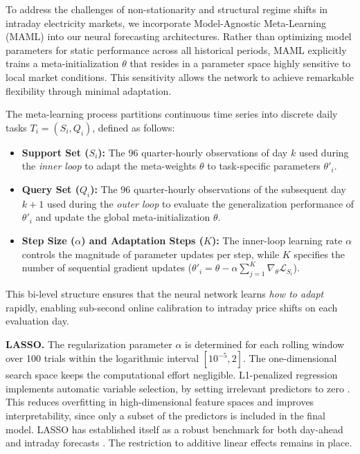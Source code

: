 \documentclass[preprint,12pt,nonatbib]{elsarticle}
\begin{document}
To address the challenges of non-stationarity and structural regime shifts in intraday electricity markets, we incorporate Model-Agnostic Meta-Learning (MAML) \cite{Finn.2017} into our neural forecasting architectures.
Rather than optimizing model parameters for static performance across all historical periods, MAML explicitly trains a meta-initialization $\theta$ that resides in a parameter space highly sensitive to local market conditions. This sensitivity allows the network to achieve remarkable flexibility through minimal adaptation.

The meta-learning process partitions continuous time series into discrete daily tasks $T_i = (S_i, Q_i)$, defined as follows:
\begin{itemize}
    \item \textbf{Support Set ($S_i$):} The $96$ quarter-hourly observations of day $k$ used during the \textit{inner loop} to adapt the meta-weights $\theta$ to task-specific parameters $\theta'_i$.
    \item \textbf{Query Set ($Q_i$):} The $96$ quarter-hourly observations of the subsequent day $k+1$ used during the \textit{outer loop} to evaluate the generalization performance of $\theta'_i$ and update the global meta-initialization $\theta$.
    \item \textbf{Step Size ($\alpha$) and Adaptation Steps ($K$):} The inner-loop learning rate $\alpha$ controls the magnitude of parameter updates per step, while $K$ specifies the number of sequential gradient updates ($\theta'_i = \theta - \alpha \sum_{j=1}^{K} \nabla_\theta \mathcal{L}_{S_i}$).
\end{itemize}
This bi-level structure ensures that the neural network learns \textit{how to adapt} rapidly, enabling sub-second online calibration to intraday price shifts on each evaluation day.

\textbf{LASSO.}
The regularization parameter $\alpha$ is determined for each rolling window over 100 trials within the logarithmic interval $[10^{-5}, 2]$.
The one-dimensional search space keeps the computational effort negligible.
L1-penalized regression implements automatic variable selection, by setting irrelevant predictors to zero \cite{Tibshirani.1996}.
This reduces overfitting in high-dimensional feature spaces and improves interpretability, since only a subset of the predictors is included in the final model.
LASSO has established itself as a robust benchmark for both day-ahead and intraday forecasts \cite{Uniejewski.2016,Ziel.2016,Narajewski.2020}.
The restriction to additive linear effects remains in place.
\end{document}
